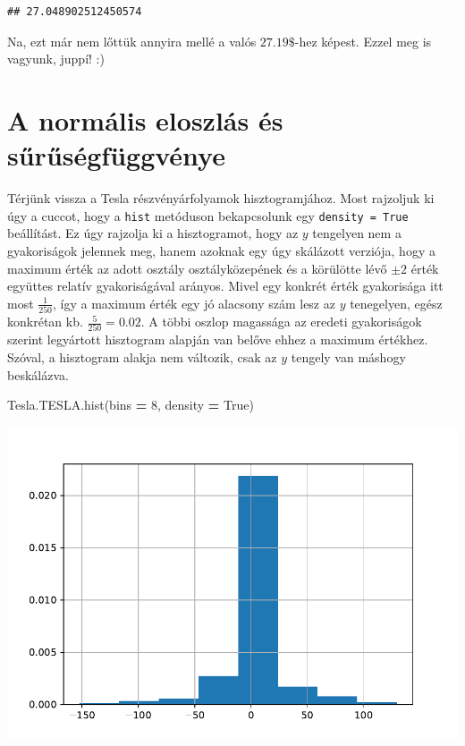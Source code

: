 \documentclass[
]{book}
\newenvironment{Shaded}{\begin{snugshade}}{\end{snugshade}}
\newcommand{\DecValTok}[1]{\textcolor[rgb]{0.00,0.00,0.81}{#1}}
\newcommand{\NormalTok}[1]{#1}
\newcommand{\OperatorTok}[1]{\textcolor[rgb]{0.81,0.36,0.00}{\textbf{#1}}}
\newcommand{\VariableTok}[1]{\textcolor[rgb]{0.00,0.00,0.00}{#1}}
\begin{document}
\begin{verbatim}
## 27.048902512450574
\end{verbatim}

Na, ezt már nem lőttük annyira mellé a valós \(27.19\$\)-hez képest. Ezzel meg is vagyunk, juppí! :)

\section{A normális eloszlás és sűrűségfüggvénye}\label{a-normuxe1lis-eloszluxe1s-uxe9s-sux171rux171suxe9gfuxfcggvuxe9nye}

Térjünk vissza a Tesla részvényárfolyamok hisztogramjához. Most rajzoljuk ki úgy a cuccot, hogy a \texttt{hist} metóduson bekapcsolunk egy \texttt{density\ =\ True} beállítást. Ez úgy rajzolja ki a hisztogramot, hogy az \(y\) tengelyen nem a gyakoriságok jelennek meg, hanem azoknak egy úgy skálázott verziója, hogy a maximum érték az adott osztály osztályközepének és a körülötte lévő \(\pm 2\) érték együttes relatív gyakoriságával arányos. Mivel egy konkrét érték gyakorisága itt most \(\frac{1}{250}\), így a maximum érték egy jó alacsony szám lesz az \(y\) tenegelyen, egész konkrétan kb. \(\frac{5}{250}=0.02\). A többi oszlop magassága az eredeti gyakoriságok szerint legyártott hisztogram alapján van belőve ehhez a maximum értékhez. Szóval, a hisztogram alakja nem változik, csak az \(y\) tengely van máshogy beskálázva.

\begin{Shaded}
\begin{Highlighting}[]
\NormalTok{Tesla.TESLA.hist(bins }\OperatorTok{=} \DecValTok{8}\NormalTok{, density }\OperatorTok{=} \VariableTok{True}\NormalTok{)}
\end{Highlighting}
\end{Shaded}

\includegraphics{_main_files/figure-latex/unnamed-chunk-159-35.pdf}
\end{document}
